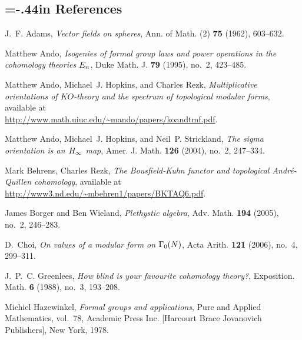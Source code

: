 \documentclass{rs}
\theoremstyle{definition}
\theoremstyle{remark}
\renewcommand{\=}{\approx}
\renewcommand{\-}{\sim}
\numberwithin{equation}{section}
\begin{document}
\begin{thebibliography}

\section*{\leftskip=-.44in References \vspace{.17in}}

J.~F. Adams, \emph{Vector fields on spheres}, Ann. of Math. (2) \textbf{75}
  (1962), 603--632. 

Matthew Ando, \emph{Isogenies of formal group laws and power operations in the
  cohomology theories {$E\sb n$}}, Duke Math. J. \textbf{79} (1995), no.~2,
  423--485. 

Matthew Ando, Michael~J. Hopkins, and Charles Rezk, \emph{Multiplicative
  orientations of {$KO$}-theory and the spectrum of topological modular forms}, 
  available at \\ \href{http://www.math.uiuc.edu/~mando/papers/koandtmf.pdf}
  {http://www.math.uiuc.edu/\textasciitilde mando/papers/koandtmf.pdf}.

Matthew Ando, Michael~J. Hopkins, and Neil~P. Strickland, \emph{The sigma
  orientation is an {$H\sb \infty$} map}, Amer. J. Math. \textbf{126} (2004),
  no.~2, 247--334. 

Mark Behrens, Charles Rezk, \emph{The Bousfield-Kuhn functor and topological 
  Andr\'e-Quillen cohomology}, available at \,\!
  \href{http://www3.nd.edu/~mbehren1/papers/BKTAQ6.pdf}
  {http://www3.nd.edu/\textasciitilde mbehren1/papers/BKTAQ6.pdf}.

James Borger and Ben Wieland, \emph{Plethystic algebra}, Adv. Math.
  \textbf{194} (2005), no.~2, 246--283. 

D.~Choi, \emph{On values of a modular form on {$\Gamma\sb 0(N)$}}, Acta Arith.
  \textbf{121} (2006), no.~4, 299--311. 

J.~P.~C. Greenlees, \emph{How blind is your favourite cohomology theory?},
  Exposition. Math. \textbf{6} (1988), no.~3, 193--208.

Michiel Hazewinkel, \emph{Formal groups and applications}, Pure and Applied
  Mathematics, vol.~78, Academic Press Inc. [Harcourt Brace Jovanovich
  Publishers], New York, 1978. 


\end{thebibliography}
\end{document}
